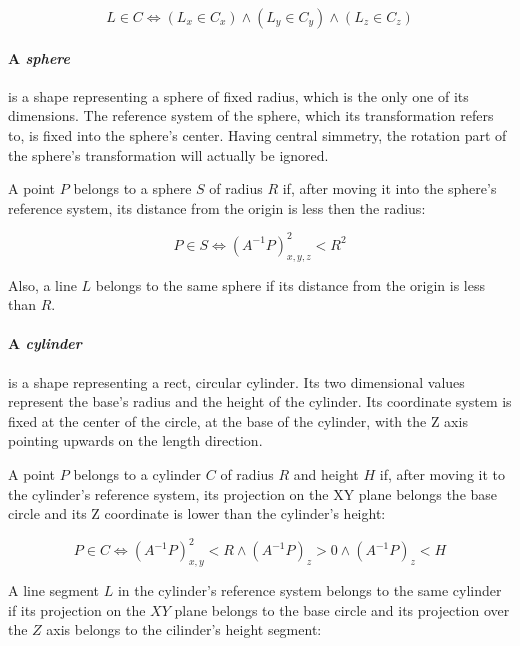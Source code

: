 \begin{equation}
  L \in C \Leftrightarrow \left(L_x \in C_x\right) \wedge
  \left(L_y \in C_y\right) \wedge \left(L_z
    \in C_z\right)
\end{equation}

\paragraph{A \emph{sphere}} is a shape representing a sphere of fixed radius,
which is the only one of its dimensions. The reference system of the sphere, 
which its transformation refers to, is fixed into the sphere's center. Having
central simmetry, the rotation part of the sphere's transformation will actually
be ignored.

A point $P$ belongs to a sphere $S$ of radius $R$ if, after moving it into the
sphere's reference system, its distance from the origin is less then the radius:

\begin{equation}
  P \in S \Leftrightarrow \left(A^{-1}P\right)_{x,y,z}^2 < R^2
\end{equation}

Also, a line $L$ belongs to the same sphere if its distance from the origin is less
than $R$.

\paragraph{A \emph{cylinder}} is a shape representing a rect, circular cylinder.
Its two dimensional values represent the base's radius and the height of the
cylinder. Its coordinate system is fixed at the center of the circle, at the
base of the cylinder, with the
Z axis pointing upwards on the length direction.

A point $P$ belongs to a cylinder $C$ of radius $R$ and height $H$ if, after
moving it to the cylinder's reference system, its projection on the XY plane
belongs the base circle and its Z coordinate is lower than the cylinder's
height:

\begin{equation}
  P \in C \Leftrightarrow \left(A^{-1}P\right)_{x,y}^2 < R \wedge
  \left(A^{-1}P\right)_z > 0 \wedge \left(A^{-1}P\right)_z<H
\end{equation}

A line segment $L$ in the cylinder's reference system belongs to the same cylinder if its projection on the $XY$
plane belongs to the base circle and its projection over the $Z$ axis belongs to
the cilinder's height segment:

